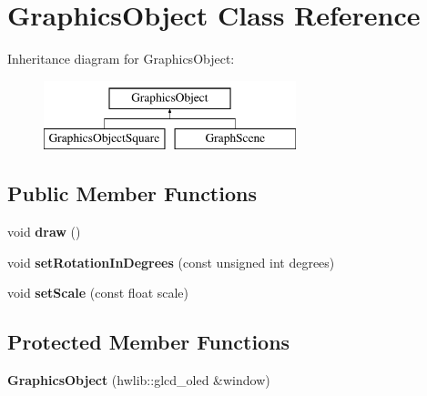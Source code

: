 \hypertarget{class_graphics_object}{}\section{Graphics\+Object Class Reference}
\label{class_graphics_object}
Inheritance diagram for Graphics\+Object\+:\begin{figure}[H]
\begin{center}
\leavevmode
\includegraphics[height=2.000000cm]{class_graphics_object}
\end{center}
\end{figure}
\subsection*{Public Member Functions}
\begin{DoxyCompactItemize}
\item 
\mbox{\label{class_graphics_object_a11f2eb63e102dcc699a74d862303a24d}} 
void {\bfseries draw} ()
\item 
\mbox{\label{class_graphics_object_a6c89361a337ba79302a56be5cb2310db}} 
void {\bfseries set\+Rotation\+In\+Degrees} (const unsigned int degrees)
\item 
\mbox{\label{class_graphics_object_a1067d816b268ff11fac3818cfaff767b}} 
void {\bfseries set\+Scale} (const float scale)
\end{DoxyCompactItemize}
\subsection*{Protected Member Functions}
\begin{DoxyCompactItemize}
\item 
\mbox{\label{class_graphics_object_a3280ad0e03fa45ff5aab899e3753580c}} 
{\bfseries Graphics\+Object} (hwlib\+::glcd\+\_\+oled \&window)
\end{DoxyCompactItemize}

